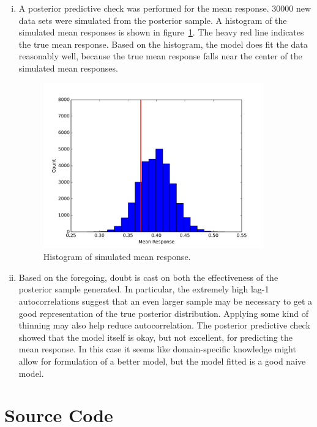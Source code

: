 \begin{enumerate}
\begin{enumerate}[i)]
    \FloatBlock
    \item
    A posterior predictive check was performed for the mean response.
    $30000$ new data sets were simulated from the posterior sample.
    A histogram of the simulated mean responses is shown in 
    figure~\ref{fig:ppc}.
    The heavy red line indicates the true mean response.
    Based on the histogram, the model does fit the data reasonably well,
    because the true mean response falls near the center of the simulated mean
    responses.
        \begin{figure}[p]
        \includegraphics[width = 0.9\textwidth]{../BayesLogit/ppc_hist.png}
        \caption{
            Histogram of simulated mean response.
        }
        \label{fig:ppc}
        \end{figure}

    \item
    Based on the foregoing, doubt is cast on both the effectiveness of the
    posterior sample generated.
    In particular, the extremely high lag-1 autocorrelations suggest that an 
    even larger sample may be necessary to get a good representation of the 
    true posterior distribution. 
    Applying some kind of thinning may also help reduce autocorrelation.
    The posterior predictive check showed that the model itself is okay,
    but not excellent, for predicting the mean response. In this case it seems
    like domain-specific knowledge might allow for formulation of a better
    model, but the model fitted is a good naive model.
    \end{enumerate}
\end{enumerate}

\clearpage
\chapter{Source Code}



